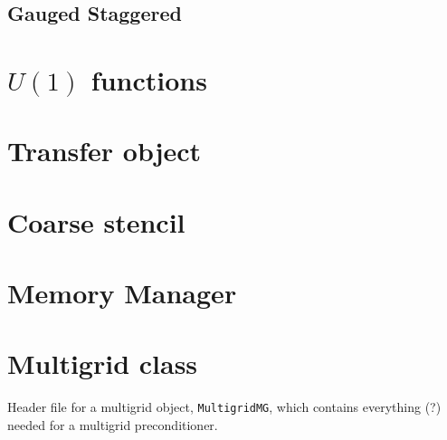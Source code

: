 \documentclass[pdftex,letterpaper,10pt]{article}
\begin{document}
\subsection{Gauged Staggered}

\section{$U(1)$ functions}

\section{Transfer object}

\section{Coarse stencil}

\section{Memory Manager}

\section{Multigrid class}


Header file for a multigrid object, \texttt{MultigridMG}, which contains everything (?) needed for a multigrid preconditioner.
\end{document}
